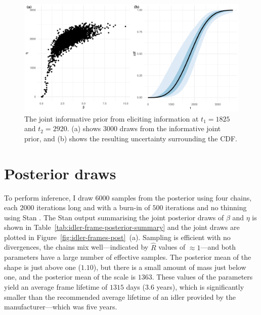 \begin{figure}
  \centering
  \includegraphics[width=1\textwidth]{./figures/ch-3/idler-frame-prior.pdf}
  \caption{The joint informative prior from eliciting information at $t_1 = 1825$ and $t_2 = 2920$. (a) shows 3000 draws from the informative joint prior, and (b) shows the resulting uncertainty surrounding the CDF.}
  \label{fig:idler-frames-prior}
\end{figure}

\section{Posterior draws} \label{sec:idler-frame-posterior}

To perform inference, I draw $6000$ samples from the posterior using four chains, each $2000$ iterations long and with a burn-in of $500$ iterations and no thinning using Stan \citep{Stan2022}. The Stan output summarising the joint posterior draws of $\beta$ and $\eta$ is shown in Table~\ref{tab:idler-frame-posterior-summary} and the joint draws are plotted in Figure~\ref{fig:idler-frames-post}~(a). Sampling is efficient with no divergences, the chains mix well---indicated by $\hat{R}$ values of $\approx 1$---and both parameters have a large number of effective samples. The posterior mean of the shape is just above one ($1.10$), but there is a small amount of mass just below one, and the posterior mean of the scale is $1363$. These values of the parameters yield an average frame lifetime of $1315$ days ($3.6$ years), which is significantly smaller than the recommended average lifetime of an idler provided by the manufacturer---which was five years.



